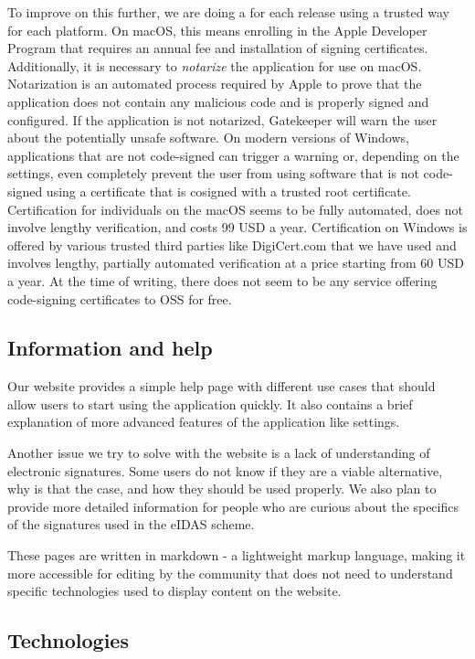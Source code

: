 \documentclass[thesismargins, english, thesislinespacing, onelinechapterstyle, upjsfrontpage]{rnthesis}
\begin{document}
To improve on this further, we are doing a  for each release using a trusted way for each platform.
On macOS, this means enrolling in the Apple Developer Program that requires an annual fee and installation of signing certificates.
Additionally, it is necessary to \textit{notarize} the application for use on macOS.
Notarization is an automated process required by Apple to prove that the application does not contain any malicious code and is properly signed and configured.
If the application is not notarized, Gatekeeper will warn the user about the potentially unsafe software.
On modern versions of Windows, applications that are not code-signed can trigger a warning or, depending on the settings, even completely prevent the user from using software that is not code-signed using a certificate that is cosigned with a trusted root certificate.
Certification for individuals on the macOS seems to be fully automated, does not involve lengthy verification, and costs 99 USD a year.
Certification on Windows is offered by various trusted third parties like DigiCert.com that we have used and involves lengthy, partially automated verification at a price starting from 60 USD a year.
At the time of writing, there does not seem to be any service offering code-signing certificates to OSS for free.

\subsection{Information and help}

Our website provides a simple help page with different use cases that should allow users to start using the application quickly.
It also contains a brief explanation of more advanced features of the application like settings.

Another issue we try to solve with the website is a lack of understanding of electronic signatures.
Some users do not know if they are a viable alternative, why is that the case, and how they should be used properly.
We also plan to provide more detailed information for people who are curious about the specifics of the signatures used in the eIDAS scheme.

These pages are written in markdown - a lightweight markup language, making it more accessible for editing by the community that does not need to understand specific technologies used to display content on the website.

\subsection{Technologies}
\end{document}
